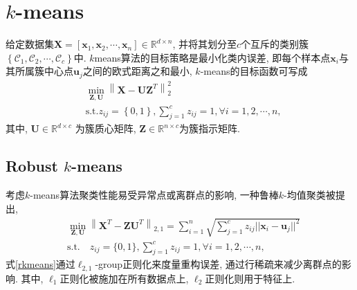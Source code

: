 \documentclass[lang=cn,10pt]{gorgeousnbook}
\numberwithin{equation}{section}%
\numberwithin{figure}{section}%
\begin{document}
\section{$k$-means}
给定数据集$\bm{X} = [\bm{x}_1,\bm{x}_2,\cdots,\bm{x}_n]\in\mathbb{R}^{d\times n}$, 并将其划分至$c$个互斥的类别簇$\left\{\mathcal{C}_1,\mathcal{C}_2,\cdots,\mathcal{C}_c\right\}$中. $k$means算法的目标策略是最小化类内误差, 即每个样本点$\bm{x}_i$与其所属簇中心点$\bm{u}_j$之间的欧式距离之和最小, $k$-means的目标函数可写成
\begin{equation}
\begin{aligned}
&\min_{\boldsymbol{Z},\boldsymbol{U}} \left\| \boldsymbol{X}-\boldsymbol{UZ}^T \right\| _{2}^{2}\\
&\mathrm{s}.\mathrm{t}. z_{ij}=\left\{ 0,1 \right\} ,\sum_{j=1}^c{z_{ij}=1,\forall i=1,2,\cdots ,n,}
\end{aligned}
\end{equation}
其中, $\bm{U}\in\mathbb{R}^{d\times c}$ 为簇质心矩阵, $\bm{Z}\in\mathbb{R}^{n\times c}$为簇指示矩阵. 
\subsection{Robust $k$-means}
考虑$k$-means算法聚类性能易受异常点或离群点的影响, 一种鲁棒$k$-均值聚类被提出,
\begin{equation}
\begin{aligned}
&\min_{\bm{Z},\bm{U}}\left\|\bm{X}^T-\bm{ZU}^T\right\|_{2,1}=\sum_{i=1}^n\sqrt{\sum_{j=1}^cz_{ij}||\boldsymbol{x}_i-\boldsymbol{u}_j||^2}\\
&\text{s.t.}\quad z_{ij}=\{0,1\},\sum_{j=1}^cz_{ij}=1,\forall i=1,2,\cdots,n,
\end{aligned}\label{rkmeans}
\end{equation}
式\eqref{rkmeans}通过$\ell_{2,1}$-group正则化来度量重构误差, 通过行稀疏来减少离群点的影响. 其中, $\ell_1$正则化被施加在所有数据点上, $\ell_2$正则化则用于特征上. 
\end{document}
